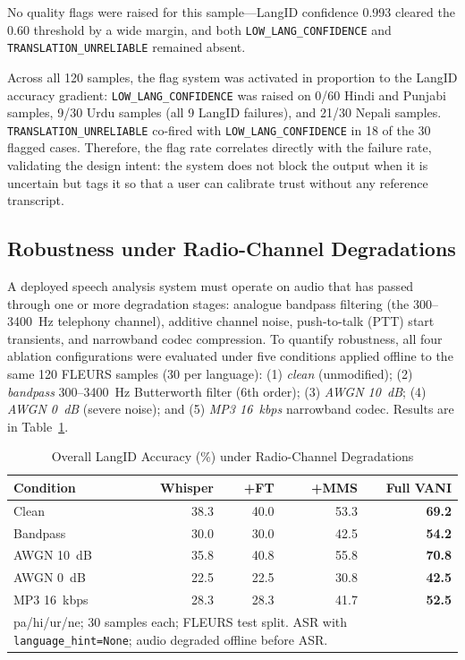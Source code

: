 \documentclass[12pt, onecolumn]{IEEEtran}
\begin{document}
No quality flags were raised for this sample---LangID confidence 0.993 cleared the 0.60 threshold by a wide margin, and both \texttt{LOW\_LANG\_CONFIDENCE} and \texttt{TRANSLATION\_UNRELIABLE} remained absent.

Across all 120 samples, the flag system was activated in proportion to the LangID accuracy gradient: \texttt{LOW\_LANG\_CONFIDENCE} was raised on 0/60 Hindi and Punjabi samples, 9/30 Urdu samples (all 9 LangID failures), and 21/30 Nepali samples. \texttt{TRANSLATION\_UNRELIABLE} co-fired with \texttt{LOW\_LANG\_CONFIDENCE} in 18 of the 30 flagged cases. Therefore, the flag rate correlates directly with the failure rate, validating the design intent: the system does not block the output when it is uncertain but tags it so that a user can calibrate trust without any reference transcript.

\subsection{Robustness under Radio-Channel Degradations}
\label{sec:robustness}

A deployed speech analysis system must operate on audio that has passed through one or more degradation stages: analogue bandpass filtering (the 300--3400~Hz telephony channel), additive channel noise, push-to-talk (PTT) start transients, and narrowband codec compression. To quantify robustness, all four ablation configurations were evaluated under five conditions applied offline to the same 120 FLEURS samples (30 per language): (1) \textit{clean} (unmodified); (2) \textit{bandpass} 300--3400~Hz Butterworth filter (6th order); (3) \textit{AWGN 10~dB}; (4) \textit{AWGN 0~dB} (severe noise); and (5) \textit{MP3 16~kbps} narrowband codec. Results are in Table~\ref{tab:robustness}.

\begin{table}[htbp]
\caption{Overall LangID Accuracy (\%) under Radio-Channel Degradations}
\label{tab:robustness}
\begin{center}
\begin{tabular}{lrrrr}
\toprule
\textbf{Condition} & \textbf{Whisper} & \textbf{+FT} & \textbf{+MMS} & \textbf{Full VANI} \\
\midrule
Clean          & 38.3 & 40.0 & 53.3 & \textbf{69.2} \\
Bandpass       & 30.0 & 30.0 & 42.5 & \textbf{54.2} \\
AWGN 10~dB     & 35.8 & 40.8 & 55.8 & \textbf{70.8} \\
AWGN 0~dB      & 22.5 & 22.5 & 30.8 & \textbf{42.5} \\
MP3 16~kbps    & 28.3 & 28.3 & 41.7 & \textbf{52.5} \\
\midrule
\multicolumn{5}{p{8cm}}{\footnotesize pa/hi/ur/ne; 30 samples each; FLEURS test split. ASR with \texttt{language\_hint=None}; audio degraded offline before ASR.} \\
\bottomrule
\end{tabular}
\end{center}
\end{table}
\end{document}
